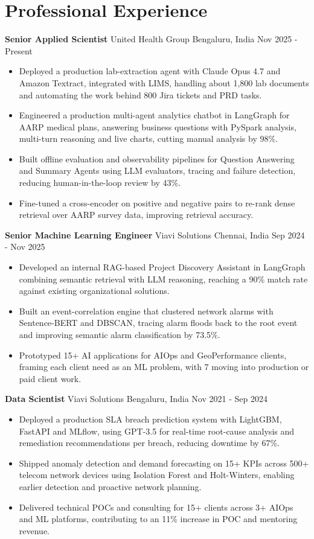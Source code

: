 \documentclass[10pt,a4paper]{article}
\newcommand{\role}[4]{\textbf{#1} \textbar{} #2 \hfill #3 \textbar{} #4\par}
\begin{document}
\section{Professional Experience}
\role{Senior Applied Scientist}{United Health Group}{Bengaluru, India}{Nov 2025 - Present}
\begin{itemize}
  \item Deployed a production lab-extraction agent with Claude Opus 4.7 and Amazon Textract, integrated with LIMS, handling about 1,800 lab documents and automating the work behind 800 Jira tickets and PRD tasks.
  \item Engineered a production multi-agent analytics chatbot in LangGraph for AARP medical plans, answering business questions with PySpark analysis, multi-turn reasoning and live charts, cutting manual analysis by 98\%.
  \item Built offline evaluation and observability pipelines for Question Answering and Summary Agents using LLM evaluators, tracing and failure detection, reducing human-in-the-loop review by 43\%.
  \item Fine-tuned a cross-encoder on positive and negative pairs to re-rank dense retrieval over AARP survey data, improving retrieval accuracy.
\end{itemize}
\vspace{3pt}
\role{Senior Machine Learning Engineer}{Viavi Solutions}{Chennai, India}{Sep 2024 - Nov 2025}
\begin{itemize}
  \item Developed an internal RAG-based Project Discovery Assistant in LangGraph combining semantic retrieval with LLM reasoning, reaching a 90\% match rate against existing organizational solutions.
  \item Built an event-correlation engine that clustered network alarms with Sentence-BERT and DBSCAN, tracing alarm floods back to the root event and improving semantic alarm classification by 73.5\%.
  \item Prototyped 15+ AI applications for AIOps and GeoPerformance clients, framing each client need as an ML problem, with 7 moving into production or paid client work.
\end{itemize}
\vspace{3pt}
\role{Data Scientist}{Viavi Solutions}{Bengaluru, India}{Nov 2021 - Sep 2024}
\begin{itemize}
  \item Deployed a production SLA breach prediction system with LightGBM, FastAPI and MLflow, using GPT-3.5 for real-time root-cause analysis and remediation recommendations per breach, reducing downtime by 67\%.
  \item Shipped anomaly detection and demand forecasting on 15+ KPIs across 500+ telecom network devices using Isolation Forest and Holt-Winters, enabling earlier detection and proactive network planning.
  \item Delivered technical POCs and consulting for 15+ clients across 3+ AIOps and ML platforms, contributing to an 11\% increase in POC and mentoring revenue.
\end{itemize}
\end{document}
